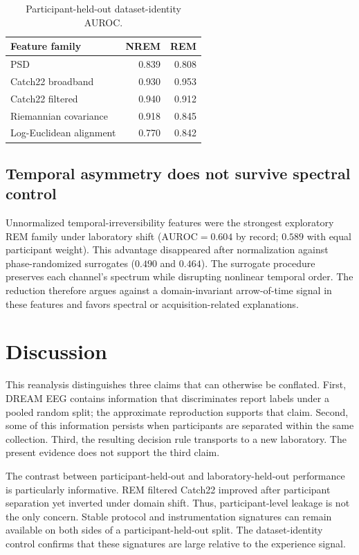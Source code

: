 \documentclass[10pt,twocolumn]{article}
\newcommand{\AUC}{\mathrm{AUROC}}
\begin{document}
\begin{table}[t]
\centering
\caption{Participant-held-out dataset-identity AUROC.}
\label{tab:identity}
\begin{tabular}{lrr}
\toprule
Feature family & NREM & REM \\
\midrule
PSD & 0.839 & 0.808 \\
Catch22 broadband & 0.930 & 0.953 \\
Catch22 filtered & 0.940 & 0.912 \\
Riemannian covariance & 0.918 & 0.845 \\
Log-Euclidean alignment & 0.770 & 0.842 \\
\bottomrule
\end{tabular}
\end{table}

\subsection{Temporal asymmetry does not survive spectral control}

Unnormalized temporal-irreversibility features were the strongest exploratory
REM family under laboratory shift ($\AUC=0.604$ by record; $0.589$ with equal
participant weight). This advantage disappeared after normalization against
phase-randomized surrogates ($0.490$ and $0.464$). The surrogate procedure
preserves each channel's spectrum while disrupting nonlinear temporal order.
The reduction therefore argues against a domain-invariant arrow-of-time signal
in these features and favors spectral or acquisition-related explanations.

\section{Discussion}

This reanalysis distinguishes three claims that can otherwise be conflated.
First, DREAM EEG contains information that discriminates report labels under a
pooled random split; the approximate reproduction supports that claim. Second,
some of this information persists when participants are separated within the
same collection. Third, the resulting decision rule transports to a new
laboratory. The present evidence does not support the third claim.

The contrast between participant-held-out and laboratory-held-out performance
is particularly informative. REM filtered Catch22 improved after participant
separation yet inverted under domain shift. Thus, participant-level leakage is
not the only concern. Stable protocol and instrumentation signatures can remain
available on both sides of a participant-held-out split. The dataset-identity
control confirms that these signatures are large relative to the experience
signal.
\end{document}
